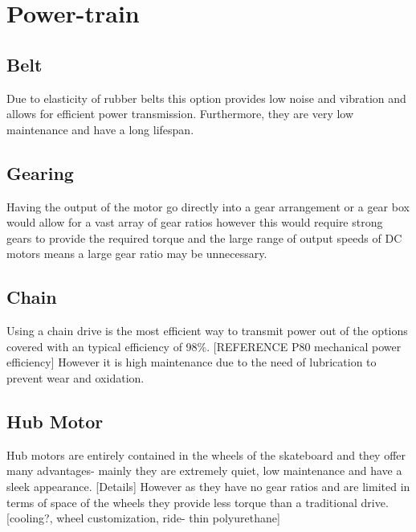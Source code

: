 \documentclass{article}
\begin{document}
\section{Power-train}

\subsection{Belt}
Due to elasticity of rubber belts this option provides low noise and vibration and allows for efficient power transmission. Furthermore, they are very low maintenance and have a long lifespan. 


\subsection{Gearing}
Having the output of the motor go directly into a gear arrangement or a gear box would allow for a vast array of gear ratios however this would require strong gears to provide the required torque and the large range of output speeds of DC motors means a large gear ratio may be unnecessary.


\subsection{Chain}
Using a chain drive is the most efficient way to transmit power out of the options covered with an typical efficiency of 98\%. [REFERENCE P80 mechanical power efficiency] However it is high maintenance due to the need of lubrication to prevent wear and oxidation. 


\subsection{Hub Motor}
Hub motors are entirely contained in the wheels of the skateboard and they offer many advantages- mainly they are extremely quiet, low maintenance and have a sleek appearance. [Details]
However as they have no gear ratios and are limited in terms of space of the wheels they provide less torque than a traditional drive. [cooling?, wheel customization, ride- thin polyurethane]
\end{document}

